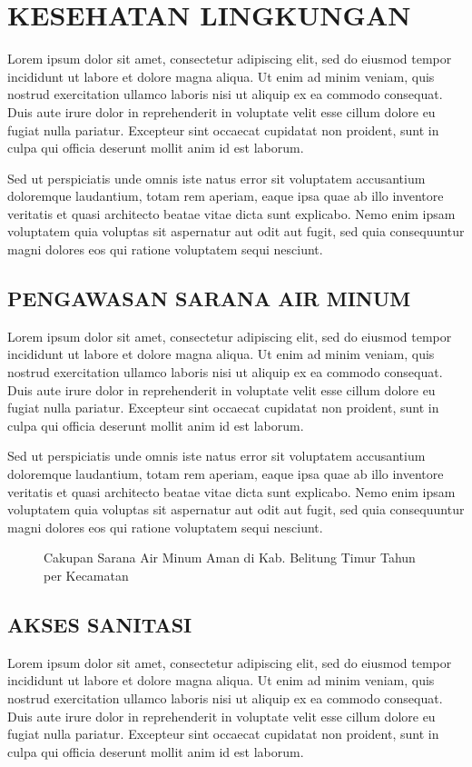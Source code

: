 \chapter{KESEHATAN LINGKUNGAN}
Lorem ipsum dolor sit amet, consectetur adipiscing elit, sed do eiusmod tempor incididunt ut labore et dolore magna aliqua. Ut enim ad minim veniam, quis nostrud exercitation ullamco laboris nisi ut aliquip ex ea commodo consequat. Duis aute irure dolor in reprehenderit in voluptate velit esse cillum dolore eu fugiat nulla pariatur. Excepteur sint occaecat cupidatat non proident, sunt in culpa qui officia deserunt mollit anim id est laborum.

Sed ut perspiciatis unde omnis iste natus error sit voluptatem accusantium doloremque laudantium, totam rem aperiam, eaque ipsa quae ab illo inventore veritatis et quasi architecto beatae vitae dicta sunt explicabo. Nemo enim ipsam voluptatem quia voluptas sit aspernatur aut odit aut fugit, sed quia consequuntur magni dolores eos qui ratione voluptatem sequi nesciunt.

\section{PENGAWASAN SARANA AIR MINUM}
Lorem ipsum dolor sit amet, consectetur adipiscing elit, sed do eiusmod tempor incididunt ut labore et dolore magna aliqua. Ut enim ad minim veniam, quis nostrud exercitation ullamco laboris nisi ut aliquip ex ea commodo consequat. Duis aute irure dolor in reprehenderit in voluptate velit esse cillum dolore eu fugiat nulla pariatur. Excepteur sint occaecat cupidatat non proident, sunt in culpa qui officia deserunt mollit anim id est laborum.

Sed ut perspiciatis unde omnis iste natus error sit voluptatem accusantium doloremque laudantium, totam rem aperiam, eaque ipsa quae ab illo inventore veritatis et quasi architecto beatae vitae dicta sunt explicabo. Nemo enim ipsam voluptatem quia voluptas sit aspernatur aut odit aut fugit, sed quia consequuntur magni dolores eos qui ratione voluptatem sequi nesciunt.

\begin{figure}[H]
	\centering
	\caption{Cakupan Sarana Air Minum Aman di Kab. Belitung Timur Tahun \tP per Kecamatan}
	\label{fig:Cakupan-Air-Minum-Aman}
\end{figure}

\section{AKSES SANITASI}
Lorem ipsum dolor sit amet, consectetur adipiscing elit, sed do eiusmod tempor incididunt ut labore et dolore magna aliqua. Ut enim ad minim veniam, quis nostrud exercitation ullamco laboris nisi ut aliquip ex ea commodo consequat. Duis aute irure dolor in reprehenderit in voluptate velit esse cillum dolore eu fugiat nulla pariatur. Excepteur sint occaecat cupidatat non proident, sunt in culpa qui officia deserunt mollit anim id est laborum.

